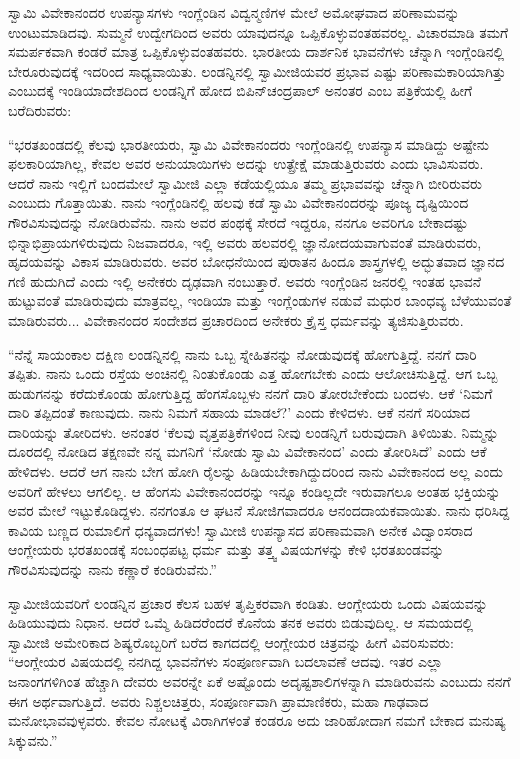 \vskip 2pt

 ಸ್ವಾಮಿ ವಿವೇಕಾನಂದರ ಉಪನ್ಯಾಸಗಳು ಇಂಗ್ಲೆಂಡಿನ ವಿದ್ವನ್ಮಣಿಗಳ ಮೇಲೆ ಅಮೋಘವಾದ ಪರಿಣಾಮವನ್ನು ಉಂಟುಮಾಡಿದವು. ಸುಮ್ಮನೆ ಉದ್ವೇಗದಿಂದ ಅವರು ಯಾವುದನ್ನೂ ಒಪ್ಪಿಕೊಳ್ಳುವಂತಹವರಲ್ಲ. ವಿಚಾರಮಾಡಿ ತಮಗೆ ಸಮರ್ಪಕವಾಗಿ ಕಂಡರೆ ಮಾತ್ರ ಒಪ್ಪಿಕೊಳ್ಳುವಂತಹವರು. ಭಾರತೀಯ ದಾರ್ಶನಿಕ ಭಾವನೆಗಳು ಚೆನ್ನಾಗಿ ಇಂಗ್ಲೆಂಡಿನಲ್ಲಿ ಬೇರೂರುವುದಕ್ಕೆ ಇದರಿಂದ ಸಾಧ್ಯವಾಯಿತು. ಲಂಡನ್ನಿನಲ್ಲಿ ಸ್ವಾಮೀಜಿಯವರ ಪ್ರಭಾವ ಎಷ್ಟು ಪರಿಣಾಮಕಾರಿಯಾಗಿತ್ತು ಎಂಬುದಕ್ಕೆ ಇಂಡಿಯಾದೇಶದಿಂದ ಲಂಡನ್ನಿಗೆ ಹೋದ ಬಿಪಿನ್‌ಚಂದ್ರಪಾಲ್ ಅನಂತರ  ಎಂಬ ಪತ್ರಿಕೆಯಲ್ಲಿ ಹೀಗೆ ಬರೆದಿರುವರು: 

\vskip 2pt

 “ಭರತಖಂಡದಲ್ಲಿ ಕೆಲವು ಭಾರತೀಯರು, ಸ್ವಾಮಿ ವಿವೇಕಾನಂದರು ಇಂಗ್ಲೆಂಡಿನಲ್ಲಿ ಉಪನ್ಯಾಸ ಮಾಡಿದ್ದು ಅಷ್ಟೇನು ಫಲಕಾರಿಯಾಗಿಲ್ಲ, ಕೇವಲ ಅವರ ಅನುಯಾಯಿಗಳು ಅದನ್ನು ಉತ್ಪ್ರೇಕ್ಷೆ ಮಾಡುತ್ತಿರುವರು ಎಂದು ಭಾವಿಸುವರು. ಆದರೆ ನಾನು ಇಲ್ಲಿಗೆ ಬಂದಮೇಲೆ ಸ್ವಾಮೀಜಿ ಎಲ್ಲಾ ಕಡೆಯಲ್ಲಿಯೂ ತಮ್ಮ ಪ್ರಭಾವವನ್ನು ಚೆನ್ನಾಗಿ ಬೀರಿರುವರು ಎಂಬುದು ಗೊತ್ತಾಯಿತು. ನಾನು ಇಂಗ್ಲೆಂಡಿನಲ್ಲಿ ಹಲವು ಕಡೆ ಸ್ವಾಮಿ ವಿವೇಕಾನಂದರನ್ನು ಪೂಜ್ಯ ದೃಷ್ಟಿಯಿಂದ ಗೌರವಿಸುವುದನ್ನು ನೋಡಿರುವೆನು. ನಾನು ಅವರ ಪಂಥಕ್ಕೆ ಸೇರದೆ ಇದ್ದರೂ, ನನಗೂ ಅವರಿಗೂ ಬೇಕಾದಷ್ಟು ಭಿನ್ನಾಭಿಪ್ರಾಯಗಳಿರುವುದು ನಿಜವಾದರೂ, ಇಲ್ಲಿ ಅವರು ಹಲವರಲ್ಲಿ ಜ್ಞಾನೋದಯವಾಗುವಂತೆ ಮಾಡಿರುವರು, ಹೃದಯವನ್ನು ವಿಕಾಸ ಮಾಡಿರುವರು. ಅವರ ಬೋಧನೆಯಿಂದ ಪುರಾತನ ಹಿಂದೂ ಶಾಸ್ತ್ರಗಳಲ್ಲಿ ಅದ್ಭುತವಾದ ಜ್ಞಾನದ ಗಣಿ ಹುದುಗಿದೆ ಎಂದು ಇಲ್ಲಿ ಅನೇಕರು ದೃಢವಾಗಿ ನಂಬುತ್ತಾರೆ. ಅವರು ಇಂಗ್ಲೆಂಡಿನ ಜನರಲ್ಲಿ ಇಂತಹ ಭಾವನೆ ಹುಟ್ಟುವಂತೆ ಮಾಡಿರುವುದು ಮಾತ್ರವಲ್ಲ, ಇಂಡಿಯಾ ಮತ್ತು ಇಂಗ್ಲೆಂಡುಗಳ ನಡುವೆ ಮಧುರ ಬಾಂಧವ್ಯ ಬೆಳೆಯುವಂತೆ ಮಾಡಿರುವರು... ವಿವೇಕಾನಂದರ ಸಂದೇಶದ ಪ್ರಚಾರದಿಂದ ಅನೇಕರು ಕ್ರೈಸ್ತ ಧರ್ಮವನ್ನು ತ್ಯಜಿಸುತ್ತಿರುವರು. 

 “ನೆನ್ನೆ ಸಾಯಂಕಾಲ ದಕ್ಷಿಣ ಲಂಡನ್ನಿನಲ್ಲಿ ನಾನು ಒಬ್ಬ ಸ್ನೇಹಿತನನ್ನು ನೋಡುವುದಕ್ಕೆ ಹೋಗುತ್ತಿದ್ದೆ. ನನಗೆ ದಾರಿ ತಪ್ಪಿತು. ನಾನು ಒಂದು ರಸ್ತೆಯ ಅಂಚಿನಲ್ಲಿ ನಿಂತುಕೊಂಡು ಎತ್ತ ಹೋಗಬೇಕು ಎಂದು ಆಲೋಚಿಸುತ್ತಿದ್ದೆ. ಆಗ ಒಬ್ಬ ಹುಡುಗನನ್ನು ಕರೆದುಕೊಂಡು ಹೋಗುತ್ತಿದ್ದ ಹೆಂಗಸೊಬ್ಬಳು ನನಗೆ ದಾರಿ ತೋರಬೇಕೆಂದು ಬಂದಳು. ಆಕೆ ‘ನಿಮಗೆ ದಾರಿ ತಪ್ಪಿದಂತೆ ಕಾಣುವುದು. ನಾನು ನಿಮಗೆ ಸಹಾಯ ಮಾಡಲೆ?’ ಎಂದು ಕೇಳಿದಳು. ಆಕೆ ನನಗೆ ಸರಿಯಾದ ದಾರಿಯನ್ನು ತೋರಿದಳು. ಅನಂತರ ‘ಕೆಲವು ವೃತ್ತಪತ್ರಿಕೆಗಳಿಂದ ನೀವು ಲಂಡನ್ನಿಗೆ ಬರುವುದಾಗಿ ತಿಳಿಯಿತು. ನಿಮ್ಮನ್ನು ದೂರದಲ್ಲಿ ನೋಡಿದ ತಕ್ಷಣವೇ ನನ್ನ ಮಗನಿಗೆ ‘ನೋಡು ಸ್ವಾಮಿ ವಿವೇಕಾನಂದ’ ಎಂದು ತೋರಿಸಿದೆ’ ಎಂದು ಆಕೆ ಹೇಳಿದಳು. ಆದರೆ ಆಗ ನಾನು ಬೇಗ ಹೋಗಿ ರೈಲನ್ನು ಹಿಡಿಯಬೇಕಾಗಿದ್ದುದರಿಂದ ನಾನು ವಿವೇಕಾನಂದ ಅಲ್ಲ ಎಂದು ಅವರಿಗೆ ಹೇಳಲು ಆಗಲಿಲ್ಲ. ಆ ಹೆಂಗಸು ವಿವೇಕಾನಂದರನ್ನು ಇನ್ನೂ ಕಂಡಿಲ್ಲದೇ ಇರುವಾಗಲೂ ಅಂತಹ ಭಕ್ತಿಯನ್ನು ಅವರ ಮೇಲೆ ಇಟ್ಟುಕೊಡಿದ್ದಳು. ನನಗಂತೂ ಆ ಘಟನೆ ಸೋಜಿಗವಾದರೂ ಆನಂದದಾಯಕವಾಯಿತು. ನಾನು ಧರಿಸಿದ್ದ ಕಾವಿಯ ಬಣ್ಣದ ರುಮಾಲಿಗೆ ಧನ್ಯವಾದಗಳು! ಸ್ವಾಮೀಜಿ ಉಪನ್ಯಾಸದ ಪರಿಣಾಮವಾಗಿ ಅನೇಕ ವಿದ್ವಾಂಸರಾದ ಆಂಗ್ಲೇಯರು ಭರತಖಂಡಕ್ಕೆ ಸಂಬಂಧಪಟ್ಟ ಧರ್ಮ ಮತ್ತು ತತ್ತ್ವ ವಿಷಯಗಳನ್ನು ಕೇಳಿ ಭರತಖಂಡವನ್ನು ಗೌರವಿಸುವುದನ್ನು ನಾನು ಕಣ್ಣಾರೆ ಕಂಡಿರುವೆನು.” 

 ಸ್ವಾಮೀಜಿಯವರಿಗೆ ಲಂಡನ್ನಿನ ಪ್ರಚಾರ ಕೆಲಸ ಬಹಳ ತೃಪ್ತಿಕರವಾಗಿ ಕಂಡಿತು. ಆಂಗ್ಲೇಯರು ಒಂದು ವಿಷಯವನ್ನು ಹಿಡಿಯುವುದು ನಿಧಾನ. ಆದರೆ ಒಮ್ಮೆ ಹಿಡಿದರೆಂದರೆ ಕೊನೆಯ ತನಕ ಅವರು ಬಿಡುವುದಿಲ್ಲ. ಆ ಸಮಯದಲ್ಲಿ ಸ್ವಾಮೀಜಿ ಅಮೇರಿಕಾದ ಶಿಷ್ಯರೊಬ್ಬರಿಗೆ ಬರೆದ ಕಾಗದದಲ್ಲಿ ಆಂಗ್ಲೇಯರ ಚಿತ್ರವನ್ನು ಹೀಗೆ ವಿವರಿಸುವರು: “ಆಂಗ್ಲೇಯರ ವಿಷಯದಲ್ಲಿ ನನಗಿದ್ದ ಭಾವನೆಗಳು ಸಂಪೂರ್ಣವಾಗಿ ಬದಲಾವಣೆ ಆದವು. ಇತರ ಎಲ್ಲಾ ಜನಾಂಗಗಳಿಗಿಂತ ಹೆಚ್ಚಾಗಿ ದೇವರು ಅವರನ್ನೇ ಏಕೆ ಅಷ್ಟೊಂದು ಅದೃಷ್ಟಶಾಲಿಗಳನ್ನಾಗಿ ಮಾಡಿರುವನು ಎಂಬುದು ನನಗೆ ಈಗ ಅರ್ಥವಾಗುತ್ತಿದೆ. ಅವರು ನಿಶ್ಚಲಚಿತ್ತರು, ಸಂಪೂರ್ಣವಾಗಿ ಪ್ರಾಮಾಣಿಕರು, ಮಹಾ ಗಾಢವಾದ ಮನೋಭಾವವುಳ್ಳವರು. ಕೇವಲ ನೋಟಕ್ಕೆ ವಿರಾಗಿಗಳಂತೆ ಕಂಡರೂ ಅದು ಜಾರಿಹೋದಾಗ ನಮಗೆ ಬೇಕಾದ ಮನುಷ್ಯ ಸಿಕ್ಕುವನು.” 

